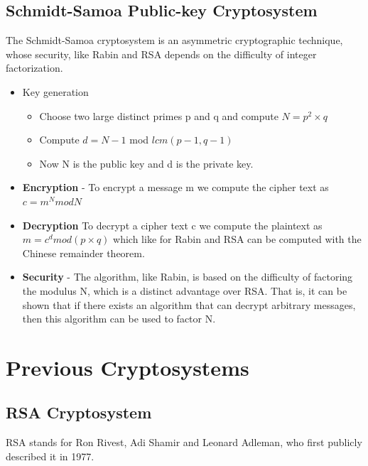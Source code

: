 \documentclass[12pt]{article} %
\begin{document}
\subsection{Schmidt-Samoa Public-key Cryptosystem}
The Schmidt-Samoa cryptosystem is an asymmetric cryptographic technique, whose security, like Rabin and RSA depends on the difficulty of integer factorization.
\begin{itemize}
\item{Key generation}
\begin{itemize}
\item{}Choose two large distinct primes p and q and compute $N = p^2 \times q$
\item{}Compute $d = N-1$ mod $lcm(p - 1, q - 1)$
\item{}Now N is the public key and d is the private key.
 \end{itemize}


\item{\textbf{Encryption}} - 
To encrypt a message m we compute the cipher text as $c = m^N mod N$
 
\item{\textbf{Decryption}}
To decrypt a cipher text c we compute the plaintext as $m = c^d mod (p\times q)$ which like for Rabin and RSA can be computed with the Chinese remainder theorem.



\item{\textbf{Security}} - 
The algorithm, like Rabin, is based on the difficulty of factoring the modulus N, which is a distinct advantage over RSA. That is, it can be shown that if there exists an algorithm that can decrypt arbitrary messages, then this algorithm can be used to factor N.
\end{itemize}

\section{Previous Cryptosystems}
\subsection{RSA Cryptosystem}
RSA stands for Ron Rivest, Adi Shamir and Leonard Adleman, who first publicly described it in 1977.
\end{document}
